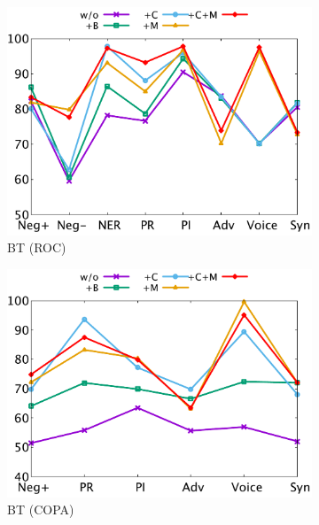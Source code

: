 \begin{figure}[th]
\centering
\begin{subfigure}[b]{0.24\textwidth}
\centering
\includegraphics[width=\columnwidth]{data/roc_bert.pdf}
\caption{BT (ROC)}
\label{fig:roc_bert}
\end{subfigure}
\hfill
\begin{subfigure}[b]{0.24\textwidth}
\centering
\includegraphics[width=\columnwidth]{data/copa_bert.pdf}
\caption{BT (COPA)}
\label{fig:copa_bert}
\end{subfigure}
\hfill
\begin{subfigure}[b]{0.24\textwidth}
\centering

\end{subfigure}
\end{figure}
